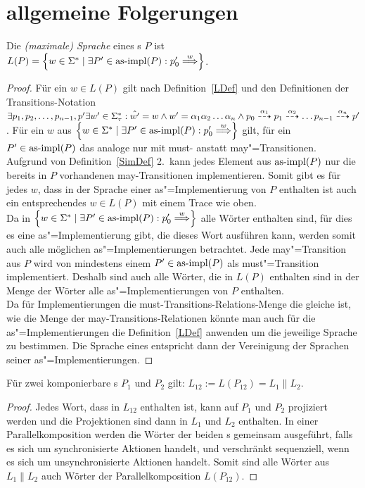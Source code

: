 \chapter{allgemeine Folgerungen}

\begin{Prop}
  \label{LImpProp}
  Die \emph{(maximale) Sprache} eines \MEIO{}s $P$ ist $L(P) = \left\{w\in
  \Sigma ^* \mid \exists P'\in\asimp (P) : p'_0\weakmust[w]
  \right\}$.
\end{Prop}
\begin{proof}
  Für ein $w\in L(P)$ gilt nach Definition~\ref{LDef} und den
  Definitionen der Transitions-Notation $\exists p_1,p_2,\dots,p_{n-1},p' \exists
  w'\in\Sigma _{\tau} ^* : \hat{w'} = w \land w'=\alpha _1\alpha _2\dots\alpha
  _n \land p_0\may[\alpha _1]p_1\may[\alpha _2] \dots p_{n-1}\may[\alpha _n]
  p'$. Für ein $w$ aus $\left\{w\in \Sigma ^* \mid \exists P'\in\asimp (P) :
  p'_0\weakmust[w] \right\}$ gilt, für ein $P'\in\mathrm{as}\text{-}\mathrm{impl} (P)$ das analoge nur
  mit must- anstatt may"=Transitionen.\\
  Aufgrund von Definition~\ref{SimDef} 2.\ kann jedes Element aus $\mathrm{as}\text{-}\mathrm{impl} (P)$
  nur die bereits in $P$ vorhandenen may-Transitionen implementieren. Somit
  gibt es für jedes $w$, dass in der Sprache einer as"=Implementierung von $P$
  enthalten ist auch ein entsprechendes $w\in L(P)$ mit einem Trace wie oben.\\
  Da in $\left\{w\in \Sigma ^* \mid \exists P'\in\asimp (P) : p'_0\weakmust[w]
  \right\}$ alle Wörter enthalten sind, für dies es eine as"=Implementierung
  gibt, die dieses Wort ausführen kann, werden somit auch alle möglichen
  as"=Implementierungen betrachtet. Jede may"=Transition aus $P$ wird von
  mindestens einem $P'\in\mathrm{as}\text{-}\mathrm{impl} (P)$ als must"=Transition implementiert.
  Deshalb sind auch alle Wörter, die in $L(P)$ enthalten sind in der Menge der
  Wörter alle as"=Implementierungen von $P$ enthalten.\\
  Da für Implementierungen die must-Transitions-Relations-Menge die gleiche ist,
  wie die Menge der may-Transitions-Relationen könnte man auch für die
  as"=Implementierungen die Definition~\ref{LDef} anwenden um die jeweilige
  Sprache zu bestimmen. Die Sprache eines \MEIO{} entspricht dann der
  Vereinigung der Sprachen seiner as"=Implementierungen.
\end{proof}

\begin{Prop}
  \label{LParallelProp}
  Für zwei komponierbare \MEIO{}s $P_1$ und $P_2$ gilt: $L_{12} := L(P_{12}) =
  L_1\|L_2$.
\end{Prop}
\begin{proof}
  Jedes Wort, dass in $L_{12}$ enthalten ist, kann auf $P_1$ und $P_2$
  projiziert werden und die Projektionen sind dann in $L_1$ und $L_2$
  enthalten. In einer Parallelkomposition werden die Wörter der beiden \MEIO{}s
  gemeinsam ausgeführt, falls es sich um synchronisierte Aktionen handelt, und
  verschränkt sequenziell, wenn es sich um unsynchronisierte Aktionen handelt.
  Somit sind alle Wörter aus $L_1\|L_2$ auch Wörter der Parallelkomposition
  $L(P_{12})$.
\end{proof}

